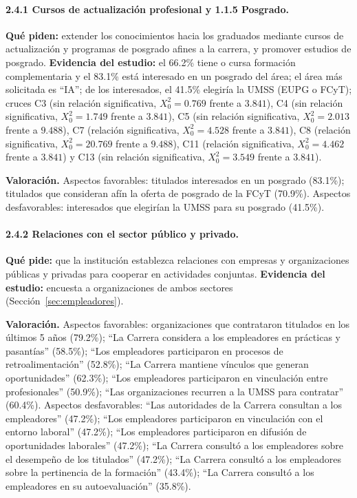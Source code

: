 \paragraph{2.4.1 Cursos de actualización profesional y 1.1.5 Posgrado.} \textbf{Qué piden:} extender los conocimientos hacia los graduados mediante cursos de actualización y programas de posgrado afines a la carrera, y promover estudios de posgrado. \textbf{Evidencia del estudio:} el 66.2\% tiene o cursa formación complementaria y el 83.1\% está interesado en un posgrado del área; el área más solicitada es ``IA''; de los interesados, el 41.5\% elegiría la UMSS (EUPG o FCyT); cruces C3 (sin relación significativa, $X_0^2 = 0.769$ frente a $3.841$), C4 (sin relación significativa, $X_0^2 = 1.749$ frente a $3.841$), C5 (sin relación significativa, $X_0^2 = 2.013$ frente a $9.488$), C7 (relación significativa, $X_0^2 = 4.528$ frente a $3.841$), C8 (relación significativa, $X_0^2 = 20.769$ frente a $9.488$), C11 (relación significativa, $X_0^2 = 4.462$ frente a $3.841$) y C13 (sin relación significativa, $X_0^2 = 3.549$ frente a $3.841$).

\textbf{Valoración.} Aspectos favorables: titulados interesados en un posgrado (83.1\%); titulados que consideran afín la oferta de posgrado de la FCyT (70.9\%). Aspectos desfavorables: interesados que elegirían la UMSS para su posgrado (41.5\%).

\paragraph{2.4.2 Relaciones con el sector público y privado.} \textbf{Qué pide:} que la institución establezca relaciones con empresas y organizaciones públicas y privadas para cooperar en actividades conjuntas. \textbf{Evidencia del estudio:} encuesta a organizaciones de ambos sectores (Sección~\ref{sec:empleadores}).

\textbf{Valoración.} Aspectos favorables: organizaciones que contrataron titulados en los últimos 5 años (79.2\%); ``La Carrera considera a los empleadores en prácticas y pasantías'' (58.5\%); ``Los empleadores participaron en procesos de retroalimentación'' (52.8\%); ``La Carrera mantiene vínculos que generan oportunidades'' (62.3\%); ``Los empleadores participaron en vinculación entre profesionales'' (50.9\%); ``Las organizaciones recurren a la UMSS para contratar'' (60.4\%). Aspectos desfavorables: ``Las autoridades de la Carrera consultan a los empleadores'' (47.2\%); ``Los empleadores participaron en vinculación con el entorno laboral'' (47.2\%); ``Los empleadores participaron en difusión de oportunidades laborales'' (47.2\%); ``La Carrera consultó a los empleadores sobre el desempeño de los titulados'' (47.2\%); ``La Carrera consultó a los empleadores sobre la pertinencia de la formación'' (43.4\%); ``La Carrera consultó a los empleadores en su autoevaluación'' (35.8\%).

